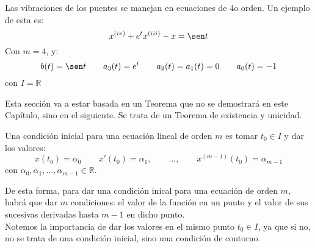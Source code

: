 \begin{ejemplo}
    Las vibraciones de los puentes se manejan en ecuaciones de 4o orden. Un ejemplo de esta es:
    \begin{equation*}
        x^{(iv)} + e^t x^{(iii)} - x = \sen t
    \end{equation*}
    Con $m=4$, y:
    \begin{equation*}
        b(t) = \sen t \qquad a_3(t) = e^t \qquad a_2(t)=a_1(t) = 0 \qquad a_0(t) = -1
    \end{equation*}
    con $I=\mathbb{R}$
\end{ejemplo}

Esta sección va a estar basada en un Teorema que no se demostrará en este Capítulo, sino en el siguiente. Se trata de un Teorema de existencia y unicidad.


\begin{definicion}
    Una condición inicial para una ecuación lineal de orden $m$ es tomar $t_0\in I$ y dar los valores:
    \begin{equation*}
        x(t_0) = \alpha_0 \qquad x'(t_0) = \alpha_1,\qquad  \ldots, \qquad  x^{(m-1)}(t_0) = \alpha_{m-1}
    \end{equation*}
    con $\alpha_0,\alpha_1,\ldots,\alpha_{m-1}\in \mathbb{R}$.
\end{definicion}
De esta forma, para dar una condición inical para una ecuación de orden $m$, habrá que dar $m$ condiciones: el valor de la función en un punto y el valor de sus sucesivas derivadas hasta $m-1$ en dicho punto.\\

Notemos la importancia de dar los valores en el mismo punto $t_0\in I$, ya que si no, no se trata de una condición inicial, sino una condición de contorno.

